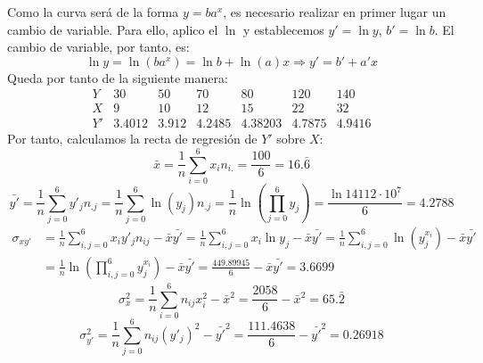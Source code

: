 \begin{ejercicio}
\begin{enumerate}
        Como la curva será de la forma $y=ba^{x}$, es necesario realizar en primer lugar un cambio de variable. Para ello, aplico el $\ln$ y establecemos $y'=\ln y$, $b'=\ln b$. El cambio de variable, por tanto, es:
        \begin{equation*}
            \ln y = \ln (ba^{x}) = \ln b + \ln(a)x \Longrightarrow y' = b'+a'x
        \end{equation*}
        Queda por tanto de la siguiente manera:
        \begin{equation*}
            \begin{array}{c|cccccc}
                Y & 30 & 50 & 70 & 80 & 120 & 140 \\ \hline
                X & 9 & 10 & 12 & 15 & 22 & 32 \\ \hline \hline
                Y' & 3.4012 & 3.912 & 4.2485 & 4.38203 & 4.7875 & 4.9416
            \end{array}
        \end{equation*}
        Por tanto, calculamos la recta de regresión de $Y'$ sobre $X$:
        \begin{equation*}
            \bar{x} = \frac{1}{n}\sum_{i=0}^6 x_{i}n_{i.} = \frac{100}{6} = 16.\bar{6}
        \end{equation*}
        \begin{equation*}
            \bar{y'} = \frac{1}{n}\sum_{j=0}^6 y'_{j}n_{.j} =  \frac{1}{n}\sum_{j=0}^6 \ln (y_{j})n_{.j}=\frac{1}{n}\ln\left(\prod_{j=0}^6 y_j\right) = \frac{\ln 14112\cdot10^7}{6} = 4.2788
        \end{equation*}
        \begin{equation*}\begin{split}
            \sigma_{xy'}
            &= \frac{1}{n}\sum_{i,j=0}^6 x_iy'_j n_{ij} - \bar{x}\bar{y'}
            = \frac{1}{n}\sum_{i,j=0}^6 x_i\ln y_j - \bar{x}\bar{y'}
            = \frac{1}{n}\sum_{i,j=0}^6 \ln (y_j^{x_i}) - \bar{x}\bar{y'} \\
            &= \frac{1}{n} \ln\left( \prod_{i,j=0}^6 y_j^{x_i} \right) - \bar{x}\bar{y'}
            = \frac{449.89945}{6} - \bar{x}\bar{y'} = 3.6699
        \end{split}\end{equation*}        
        \begin{equation*}
            \sigma_x^2 = \frac{1}{n}\sum_{i=0}^6 n_{ij}x_i^2 - \bar{x}^2 = \frac{2058}{6} - \bar{x}^2 = 65.\bar{2}
        \end{equation*}
        \begin{equation*}
            \sigma_{y'}^2 = \frac{1}{n}\sum_{j=0}^6 n_{ij}(y'_j)^2 - \bar{y'}^2 = \frac{111.4638}{6} - \bar{y'}^2 = 0.26918
        \end{equation*}


\end{enumerate}
\end{ejercicio}
